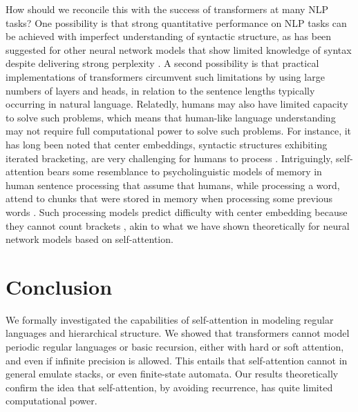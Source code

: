 \documentclass[11pt,a4paper]{article}
\begin{document}
How should we reconcile this with the success of transformers at many NLP tasks?
One possibility is that strong quantitative performance on NLP tasks can be achieved with imperfect understanding of syntactic structure, as has been suggested for other neural network models that show limited knowledge of syntax despite delivering strong perplexity  \cite{linzen2016assessing,marvin2018targeted}.
A second possibility is that practical implementations of transformers circumvent such limitations by using large numbers of layers and heads, in relation to the sentence lengths typically occurring in natural language.
Relatedly, humans may also have limited capacity to solve such problems, which means that human-like language understanding may not require full computational power to solve such problems.
For instance, it has long been noted that center embeddings, syntactic structures exhibiting iterated bracketing, are very challenging for humans to process \cite{miller-finitary-1963,gibson1999memory}.
Intriguingly, self-attention bears some resemblance to psycholinguistic models of memory in human sentence processing that assume that humans, while processing a word, attend to chunks that were stored in memory when processing some previous words \cite{lewis2005activation,parker2017cue}.
Such processing models predict difficulty with center embedding because they cannot count brackets \cite{lewis2005activation}, akin to what we have shown theoretically for neural network models based on self-attention.









\section{Conclusion}
We formally investigated the capabilities of self-attention in modeling regular languages and hierarchical structure.
We showed that transformers cannot model periodic regular languages or basic recursion, either with hard or soft attention, and even if infinite precision is allowed. %
This entails that self-attention cannot in general emulate stacks, or even finite-state automata.
Our results theoretically confirm the idea that self-attention, by avoiding recurrence, has quite limited computational power.





\end{document}
